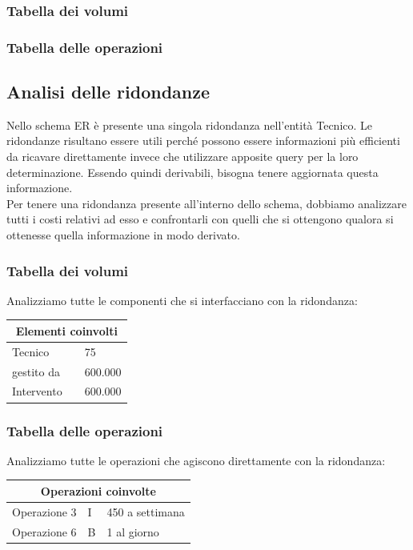 \documentclass[legalpaper]{article}
\begin{document}
\subsubsection{Tabella dei volumi}
\subsubsection{Tabella delle operazioni}


\subsection{Analisi delle ridondanze}
Nello schema ER è presente una singola ridondanza nell'entità Tecnico. Le ridondanze risultano essere utili perché possono essere informazioni più efficienti da ricavare direttamente invece che utilizzare apposite query per la loro determinazione. Essendo quindi derivabili, bisogna tenere aggiornata questa informazione.\\
	Per tenere una ridondanza presente all'interno dello schema, dobbiamo analizzare tutti i costi relativi ad esso e confrontarli con quelli che si ottengono qualora si ottenesse quella informazione in modo derivato.
	
	\subsubsection{Tabella dei volumi}
	Analizziamo tutte le componenti che si interfacciano con la ridondanza: \\ \newline
	\medskip
	\renewcommand\arraystretch{1,5}
	\begin{tabular}{|p{4cm}|p{4cm}|p{4cm}|}
		\hline
		\multicolumn{3}{|c|}{\textbf{Elementi coinvolti}}\\
		\hline
		Tecnico & \centering{E} & 75\\
		\hline
		gestito da & \centering{R} & 600.000\\
		\hline
		Intervento & \centering{E} & 600.000\\
		\hline
	\end{tabular}
	
	\subsubsection{Tabella delle operazioni}	
	Analizziamo tutte le operazioni che agiscono direttamente con la ridondanza: \\ \newline
	\medskip
	\renewcommand\arraystretch{1,5}
	\begin{tabular}{|p{4cm}|p{4cm}|p{4cm}|}
		\hline
		\multicolumn{3}{|c|}{\textbf{Operazioni coinvolte}}\\
		\hline
		Operazione 3 & I & 450 a settimana\\
		\hline
		Operazione 6 & B & 1 al giorno\\
		\hline
	\end{tabular}
\end{document}
